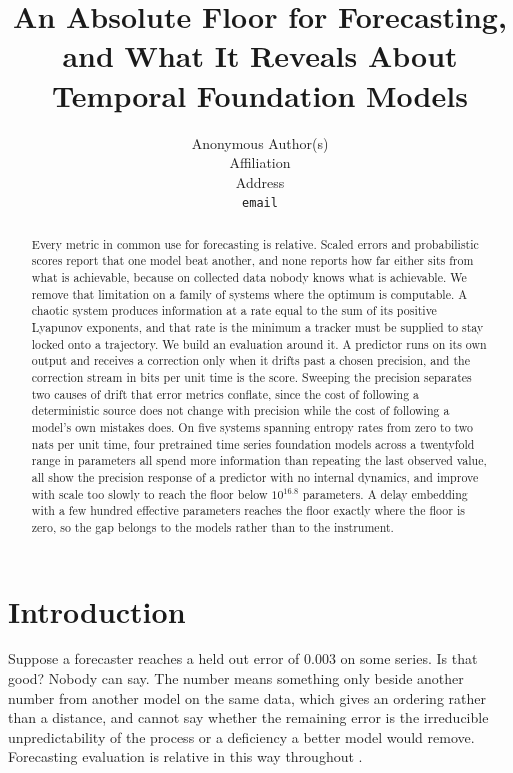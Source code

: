 \documentclass{article}
\title{An Absolute Floor for Forecasting, and What It Reveals About Temporal Foundation Models}
\author{%
  Anonymous Author(s)\\
  Affiliation\\
  Address\\
  \texttt{email}
}
\begin{document}
\maketitle

\begin{abstract}
Every metric in common use for forecasting is relative. Scaled errors and probabilistic scores report that one model beat another, and none reports how far either sits from what is achievable, because on collected data nobody knows what is achievable. We remove that limitation on a family of systems where the optimum is computable. A chaotic system produces information at a rate equal to the sum of its positive Lyapunov exponents, and that rate is the minimum a tracker must be supplied to stay locked onto a trajectory. We build an evaluation around it. A predictor runs on its own output and receives a correction only when it drifts past a chosen precision, and the correction stream in bits per unit time is the score. Sweeping the precision separates two causes of drift that error metrics conflate, since the cost of following a deterministic source does not change with precision while the cost of following a model's own mistakes does. On five systems spanning entropy rates from zero to two nats per unit time, four pretrained time series foundation models across a twentyfold range in parameters all spend more information than repeating the last observed value, all show the precision response of a predictor with no internal dynamics, and improve with scale too slowly to reach the floor below $10^{16.8}$ parameters. A delay embedding with a few hundred effective parameters reaches the floor exactly where the floor is zero, so the gap belongs to the models rather than to the instrument.
\end{abstract}

\section{Introduction}

Suppose a forecaster reaches a held out error of $0.003$ on some series. Is that good? Nobody can say. The number means something only beside another number from another model on the same data, which gives an ordering rather than a distance, and cannot say whether the remaining error is the irreducible unpredictability of the process or a deficiency a better model would remove. Forecasting evaluation is relative in this way throughout \citep{makridakis2020m4, makridakis2022m5, godahewa2021monash, aksu2024gifteval}.
\end{document}
